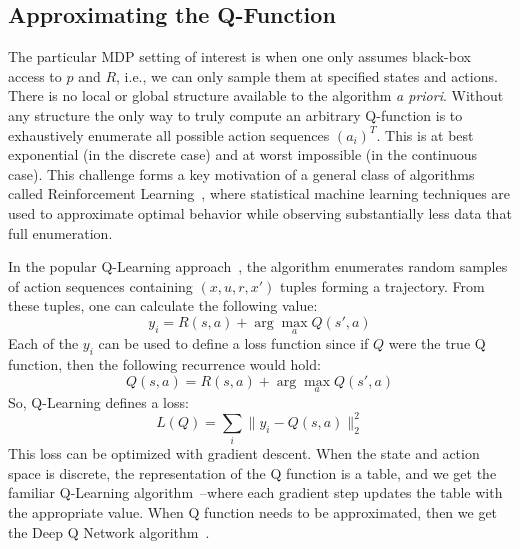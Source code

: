 \subsection*{Approximating the Q-Function}
The particular MDP setting of interest is when one only assumes black-box access to $p$ and $R$, i.e., we can only sample them at specified states and actions. There is no local or global structure available to the algorithm \emph{a priori}. Without any structure the only way to truly compute an arbitrary Q-function is to exhaustively enumerate all possible action sequences $(a_i)^T$. This is at best exponential (in the discrete case) and at worst impossible (in the continuous case). This challenge forms a key motivation of a general class of algorithms called Reinforcement Learning~\cite{sutton1998reinforcement}, where statistical machine learning techniques are used to approximate optimal behavior while observing substantially less data that full enumeration. 

In the popular Q-Learning approach~\cite{sutton1998reinforcement}, the algorithm enumerates random samples of action sequences containing $(x,u,r, x')$ tuples forming a trajectory. From these tuples, one can calculate the following value:
\[
y_i = R(s,a) + \arg \max_{a} Q(s',a)
\]
Each of the $y_i$ can be used to define a loss function since if $Q$ were the true Q function, then the following recurrence would hold:
\[
Q(s,a) = R(s,a) + \arg \max_{a} Q(s',a)
\]
So, Q-Learning defines a loss:
\[
L(Q) = \sum_{i} \|y_i - Q(s,a)\|_2^2
\]
This loss can be optimized with gradient descent. When the state and action space is discrete, the representation of the Q function is a table, and we get the familiar Q-Learning algorithm~\cite{sutton1998reinforcement}--where each gradient step updates the table with the appropriate value. When Q function needs to be approximated, then we get the Deep Q Network algorithm~\cite{mnih2015human}.

